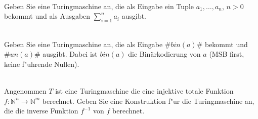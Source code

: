 \documentclass[a4paper]{article}
\begin{document}
\newpage


\\
Geben Sie eine Turingmaschine an, die als Eingabe ein Tuple $a_1,\dots,a_n$, $n>0$ bekommt und als Ausgaben $\sum_{i=1}^n a_i$ ausgibt.

\bigskip

\\
Geben Sie eine Turingmaschine an, die als Eingabe $\#bin(a)\#$ bekommt und $\#un(a)\#$ ausgibt. Dabei ist $bin(a)$ die Bin\"arkodierung von $a$ (MSB first, keine f"uhrende Nullen).

\bigskip

\\
Angenommen $T$ ist eine Turingmaschine die eine injektive totale Funktion $f:\mathbb{N}^n\rightarrow\mathbb{N}^m$ berechnet. Geben Sie eine Konstruktion f"ur die Turingmaschine an, die die inverse Funktion $f^{-1}$ von $f$ berechnet. 

\bigskip
\end{document}
